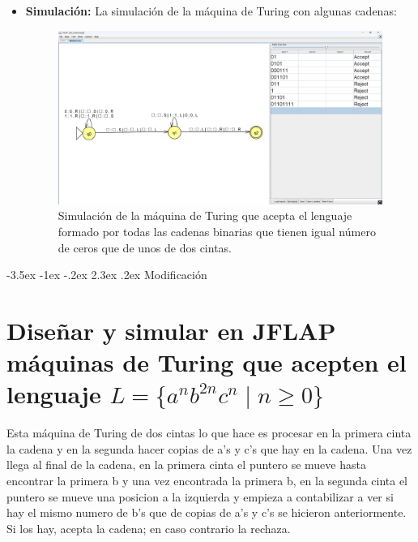 \documentclass[11pt]{report}
\makeatletter
\renewcommand\chapter{\@startsection{chapter}{0}{\z@}%
    {-3.5ex \@plus -1ex \@minus -.2ex}%
    {2.3ex \@plus.2ex}%
    {\normalfont\Large\bfseries}}
\makeatother
\begin{document}
\begin{itemize}
  \item \textbf{Simulación:} La simulación de la máquina de Turing con algunas cadenas:
        \begin{figure}[H]
          \centering
          \includegraphics[scale=0.3]{img/MT_05_multiple_ribbon_simulation.png}
          \caption{Simulación de la máquina de Turing que acepta el lenguaje formado por todas las cadenas binarias que tienen igual número de ceros que de unos de dos cintas.}
          \label{fig:simulacion de la maquina de turing que acepta el lenguaje formado por todas las cadenas binarias que tienen igual número de ceros que de unos de dos cintas}
        \end{figure}
\end{itemize}

\newpage

\chapter{Modificación}
\section{Diseñar y simular en JFLAP máquinas de Turing que acepten el lenguaje $L = \{a^nb^{2n}c^n \mid n \geq 0\}$}
Esta máquina de Turing de dos cintas lo que hace es procesar en la primera cinta la cadena y en la segunda hacer copias de a's y c's que hay en la cadena. Una vez llega al final de la cadena, en la primera cinta el puntero se mueve hasta encontrar la primera b y una vez encontrada la primera b, en la segunda cinta el puntero se mueve una posicion a la izquierda y empieza a contabilizar a ver si hay el mismo numero de b's que de copias de a's y c's se hicieron anteriormente. Si los hay, acepta la cadena; en caso contrario la rechaza.
\end{document}
